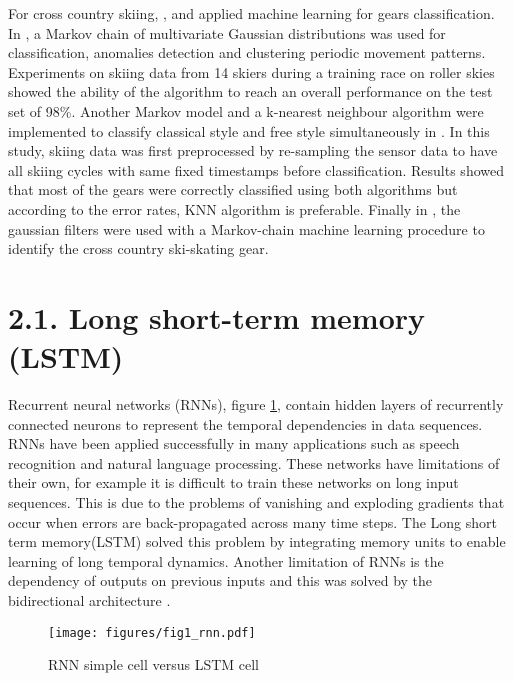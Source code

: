 \documentclass[12pt,a4paper]{article}
\begin{document}
For cross country skiing, \cite{holst2013classification}, \cite{ristnercomparison} and \cite{stoggl2014automatic} applied machine learning for gears classification. In \cite{holst2013classification}, a Markov chain of multivariate Gaussian distributions was used for classification, anomalies detection and clustering periodic movement patterns.  Experiments on skiing data from 14 skiers during a training race on roller skies showed the ability of the algorithm to reach an overall performance on the test set of 98\%.  Another Markov model and a k-nearest neighbour algorithm were implemented to classify classical style and free style simultaneously in \cite{ristnercomparison}. In this study, skiing data was first preprocessed by re-sampling the sensor data to have all skiing cycles with same fixed timestamps before classification. Results showed that most of the gears were correctly classified using both algorithms but according to the error rates, KNN algorithm is preferable. Finally in  \cite{stoggl2014automatic}, the gaussian filters were used with a Markov-chain machine learning procedure to identify the cross country ski-skating gear.


\section*{2.1. Long short-term memory (LSTM) }
Recurrent neural networks (RNNs), figure \ref{rnn}, contain hidden layers of recurrently connected neurons to represent the temporal dependencies in data sequences. RNNs have been applied successfully in many applications such as speech recognition  and natural language processing. These networks have limitations of their own, for example it is difficult to train these networks on long input sequences. This is due to  the problems of vanishing and exploding gradients that  occur when errors are back-propagated across many time steps. The Long short term memory(LSTM) solved this problem by integrating memory units to enable learning of long temporal dynamics. Another limitation of RNNs is the dependency of outputs on previous inputs and this was solved by the bidirectional architecture \cite{graves2005framewise}.

\begin{figure}[h!]
\centering
\texttt{[image: figures/fig1\_rnn.pdf]}
\caption{RNN simple cell versus LSTM cell \cite{donahue2015long}}
\label{rnn}
\end{figure}
\end{document}
